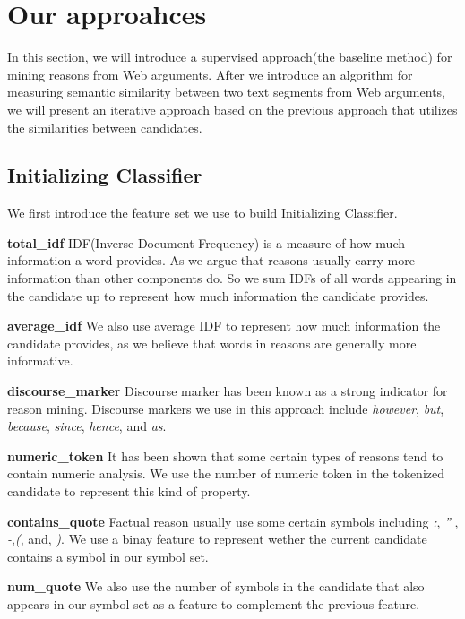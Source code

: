 \documentclass[11pt,a4paper]{article}
\begin{document}
\section{Our approahces}
\label{sec:approach}

In this section, we will introduce a supervised approach(the baseline method) for mining reasons from Web arguments. After we introduce an algorithm for measuring semantic similarity between two text segments from Web arguments, we will present an iterative approach based on the previous approach that utilizes the similarities between candidates. 

\subsection{Initializing Classifier}

We first introduce the feature set we use to build Initializing Classifier.

{\bf total\_idf} IDF(Inverse Document Frequency) is a measure of how much information a word provides\cite{salton1986introduction}. As we argue that reasons usually carry more information than other components do. So we sum IDFs of all words appearing in the candidate up to represent how much information the candidate provides.  

{\bf average\_idf} We also use average IDF to represent how much information the candidate provides, as we believe that words in reasons are generally more informative.

{\bf discourse\_marker} Discourse marker has been known as a strong indicator for reason mining\cite{stab2014argumentation}. Discourse markers we use in this approach include {\it however}, {\it but}, {\it because}, {\it since}, {\it hence}, and {\it as}.

{\bf numeric\_token} It has been shown that some certain types of reasons tend to contain numeric analysis\cite{rinott2015show}. We use the number of numeric token in the tokenized candidate to represent this kind of property.

{\bf contains\_quote} Factual reason usually use some certain symbols including {\it :}, {\it ''} , {\it -},{\it (}, and, {\it )}\cite{rinott2015show}.  We use a binay feature to represent wether the current candidate contains a symbol in our symbol set.

{\bf num\_quote} We also use the number of symbols in the candidate that also appears in our symbol set as a feature to complement the previous feature.
\end{document}

